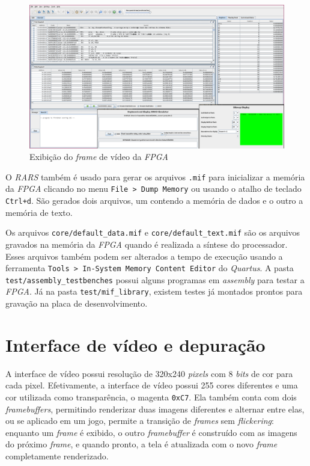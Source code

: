     \begin{figure}[H]
    \centering
        \includegraphics[width=.9\linewidth]{../images/rars_debug.png}
        \caption{Exibição do \textit{frame} de vídeo da \textit{FPGA}}
        \label{fig:rars_debug}
    \end{figure}

    { O \textit{RARS} também é usado para gerar os arquivos \texttt{.mif} para
        inicializar a memória da \textit{FPGA} clicando no menu \texttt{File > Dump Memory}
        ou usando o atalho de teclado \texttt{Ctrl+d}. São gerados dois arquivos,
        um contendo a memória de dados e o outro a memória de texto.
    }

    { Os arquivos \texttt{core/default\_data.mif} e \texttt{core/default\_text.mif}
        são os arquivos gravados na memória da \textit{FPGA} quando é realizada a
        síntese do processador. Esses arquivos também podem ser alterados a tempo
        de execução usando a ferramenta \texttt{Tools > In-System Memory Content
        Editor} do \textit{Quartus}. A pasta \texttt{test/assembly\_testbenches}
        possui alguns programas em \textit{assembly} para testar a \textit{FPGA}.
        Já na pasta \texttt{test/mif\_library}, existem testes já montados prontos
        para gravação na placa de desenvolvimento.
    }

    \section{Interface de vídeo e depuração}
    { A interface de vídeo possui resolução de 320x240 \textit{pixels} com 8
        \textit{bits} de cor para cada pixel. Efetivamente, a interface de vídeo
        possui 255 cores diferentes e uma cor utilizada como transparência, o
        magenta \texttt{0xC7}. Ela também conta com dois \textit{framebuffers},
        permitindo renderizar duas imagens diferentes e alternar entre elas, ou
        se aplicado em um jogo, permite a transição de \textit{frames} sem
        \textit{flickering}: enquanto um \textit{frame} é exibido, o outro
        \textit{framebuffer} é construído com as imagens do próximo \textit{frame},
        e quando pronto, a tela é atualizada com o novo \textit{frame}
        completamente renderizado.
    }

